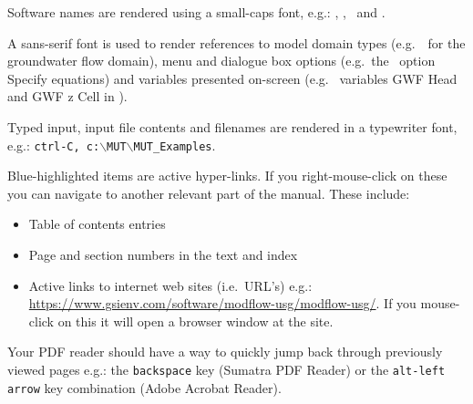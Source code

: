 Software names are rendered using a small-caps font, e.g.: \mut, \mfus, \tecplot\ and \windows.

A sans-serif font is used to render references to model domain types (e.g.\ \gwf\ for the groundwater flow domain), menu and dialogue box options (e.g.\ the \tecplot\ option {\sf Specify equations}) and variables presented on-screen (e.g. \mut\ variables  {\sf GWF Head} and {\sf GWF z Cell} in \tecplot).

Typed input, input file contents and filenames are rendered in a typewriter font, e.g.: {\tt ctrl-C, c:$\backslash$MUT$\backslash$\-MUT\_Examples}.

Blue-highlighted items are active hyper-links.  If you right-mouse-click on these you can navigate to another relevant part of the manual.  These include:
\begin{itemize}
    \item Table of contents entries
    \item Page and section numbers in the text and index
    \item Active links to internet web sites (i.e.\ URL's) e.g.:  \url{https://www.gsienv.com/software/modflow-usg/modflow-usg/}.  If you mouse-click on this it will open a browser window at the site.
\end{itemize}
Your PDF reader should have a way to quickly jump back through previously viewed pages e.g.:  the {\tt backspace} key ({\sc Sumatra} PDF Reader) or the {\tt alt-left arrow} key combination ({\sc Adobe Acrobat Reader}).


